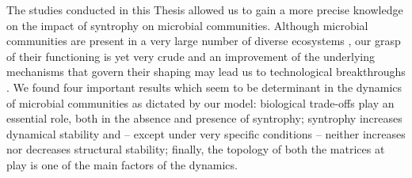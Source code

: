 \documentclass[12pt, titlepage]{report}
\begin{document}
%
%

The studies conducted in this Thesis allowed us to gain a more precise knowledge on the impact of syntrophy on microbial communities. Although microbial communities are present in a very large number of diverse ecosystems \cite{ley_worlds_2008, becerra-castro_wastewater_2015, falkowski_biogeochemical_1998}, our grasp of their functioning is yet very crude and an improvement of the underlying mechanisms that govern their shaping may lead us to technological breakthroughs \cite{kashyap_microbiome_2017}.
We found four important results which seem to be determinant in the dynamics of microbial communities as dictated by our model: biological trade-offs play an essential role, both in the absence and presence of syntrophy; syntrophy increases dynamical stability and -- except under very specific conditions -- neither increases nor decreases structural stability; finally, the topology of both the matrices at play is one of the main factors of the dynamics.
\end{document}
